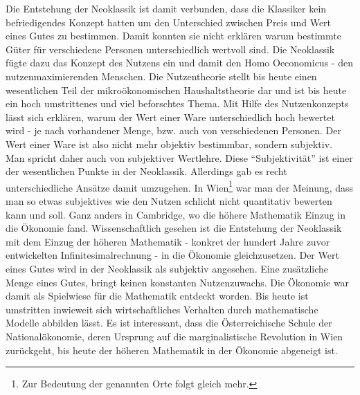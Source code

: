 Die Entstehung der Neoklassik ist damit verbunden, dass die Klassiker kein befriedigendes Konzept hatten um den Unterschied zwischen Preis und Wert eines Gutes zu bestimmen. Damit konnten sie nicht erklären warum bestimmte Güter für verschiedene Personen unterschiedlich wertvoll sind. Die Neoklassik fügte dazu das Konzept des Nutzens ein und damit den Homo Oeconomicus - den nutzenmaximierenden Menschen. Die Nutzentheorie stellt bis heute einen wesentlichen Teil der mikroökonomischen Haushaltstheorie dar und ist bis heute ein hoch umstrittenes und viel beforschtes Thema. Mit Hilfe des Nutzenkonzepts lässt sich erklären, warum der Wert einer Ware unterschiedlich hoch bewertet wird - je nach vorhandener Menge, bzw. auch von verschiedenen Personen. Der Wert einer Ware ist also nicht mehr objektiv bestimmbar, sondern subjektiv. Man spricht daher auch von subjektiver Wertlehre. Diese "`Subjektivität"' ist einer der wesentlichen Punkte in der Neoklassik. Allerdings gab es recht unterschiedliche Ansätze damit umzugehen. In Wien\footnote{Zur Bedeutung der genannten Orte folgt gleich mehr.} war man der Meinung, dass man so etwas subjektives wie den Nutzen schlicht nicht quantitativ bewerten kann und soll. Ganz anders in Cambridge, wo die höhere Mathematik Einzug in die Ökonomie fand. Wissenschaftlich gesehen ist die Entstehung der Neoklassik mit dem Einzug der höheren Mathematik - konkret der hundert Jahre zuvor entwickelten Infinitesimalrechnung -  in die Ökonomie gleichzusetzen. Der Wert eines Gutes wird in der Neoklassik als subjektiv angesehen. Eine zusätzliche Menge eines Gutes, bringt keinen konstanten Nutzenzuwachs. Die Ökonomie war damit als Spielwiese für die Mathematik entdeckt worden. Bis heute ist umstritten inwieweit sich wirtschaftliches Verhalten durch mathematische Modelle abbilden lässt. Es ist interessant, dass die Österreichische Schule der Nationalökonomie, deren Ursprung auf die marginalistische Revolution in Wien zurückgeht, bis heute der höheren Mathematik in der Ökonomie abgeneigt ist.

